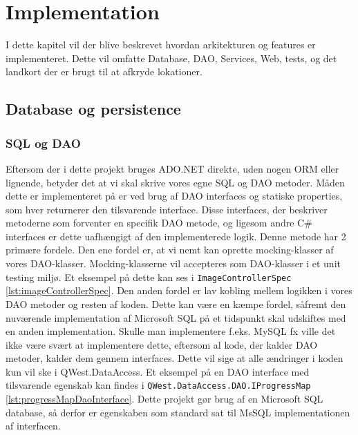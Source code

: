 \chapter{Implementation}\label{ch:implementation}
I dette kapitel vil der blive beskrevet hvordan arkitekturen og features er implementeret. Dette vil omfatte Database, DAO, Services, Web, tests, og det landkort der er brugt til at afkryde lokationer.

\section{Database og persistence}\label{sec:database}

\subsection{SQL og DAO}\label{sec:sqlOgDao}
Eftersom der i dette projekt bruges ADO.NET direkte, uden nogen ORM eller lignende, betyder det at vi skal skrive vores egne SQL og DAO metoder. Måden dette er implementeret på er ved brug af DAO interfaces og statiske properties, som hver returnerer den tilsvarende interface. Disse interfaces, der beskriver metoderne som forventer en specifik DAO metode, og ligesom andre C\# interfaces er dette uafhængigt af den implementerede logik.
Denne metode har 2 primære fordele. Den ene fordel er, at vi nemt kan oprette mocking-klasser af vores DAO-klasser. Mocking-klasserne vil accepteres som DAO-klasser i et unit testing miljø. Et eksempel på dette kan ses i \texttt{ImageControllerSpec} \ref{lst:imageControllerSpec}.
Den anden fordel er lav kobling mellem logikken i vores DAO metoder og resten af koden. Dette kan være en kæmpe fordel, såfremt den nuværende implementation af Microsoft SQL på et tidspunkt skal udskiftes med en anden implementation. Skulle man implementere f.eks. MySQL\cite{mysql} fx ville det ikke være svært at implementere dette, eftersom al kode, der kalder DAO metoder, kalder dem gennem interfaces. Dette vil sige at alle ændringer i koden kun vil ske i QWest.DataAccess. Et eksempel på en DAO interface med tilsvarende egenskab kan findes i \texttt{QWest.DataAccess.DAO.IProgressMap} \ref{lst:progressMapDaoInterface}.
Dette projekt gør brug af en Microsoft SQL database, så derfor er egenskaben som standard sat til MsSQL implementationen af interfacen.

